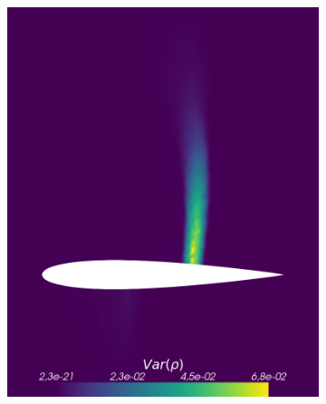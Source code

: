 \begin{figure}[h!]
\begin{subfigure}{0.3\linewidth}
				\includegraphics[scale=0.2]{figs/Euler1DPlots5/sc100_VarRho.png}
		\label{fig:referenceSolutionsub2}
	\end{subfigure}
	\hfill
	\begin{subfigure}{0.3\linewidth}
		\centering

\end{subfigure}
\end{figure}
